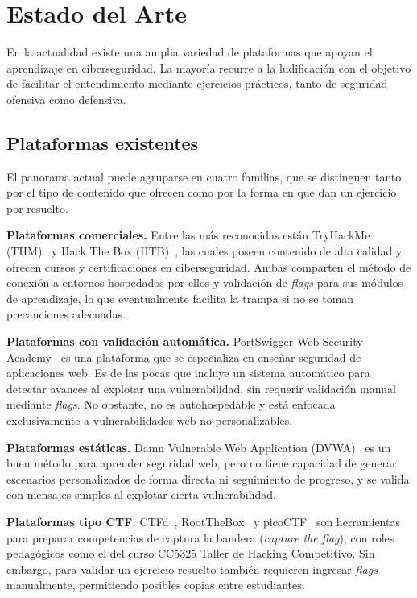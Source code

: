 \chapter{Estado del Arte}
\label{sec:estado-del-arte}

En la actualidad existe una amplia variedad de plataformas que apoyan el
aprendizaje en ciberseguridad. La mayoría recurre a la ludificación con el
objetivo de facilitar el entendimiento mediante ejercicios prácticos, tanto de
seguridad ofensiva como defensiva.

\section{Plataformas existentes}

El panorama actual puede agruparse en cuatro familias, que se distinguen tanto
por el tipo de contenido que ofrecen como por la forma en que dan un ejercicio
por resuelto.

\textbf{Plataformas comerciales.} Entre las más reconocidas están TryHackMe
(THM)~\cite{tryhackme} y Hack The Box (HTB)~\cite{hackthebox}, las cuales poseen
contenido de alta calidad y ofrecen cursos y certificaciones en ciberseguridad.
Ambas comparten el método de conexión a entornos hospedados por ellos y
validación de \textit{flags} para sus módulos de aprendizaje, lo que
eventualmente facilita la trampa si no se toman precauciones adecuadas.

\textbf{Plataformas con validación automática.} PortSwigger Web Security
Academy~\cite{portswigger} es una plataforma que se especializa en enseñar
seguridad de aplicaciones web. Es de las pocas que incluye un sistema
automático para detectar avances al explotar una vulnerabilidad, sin requerir
validación manual mediante \textit{flags}. No obstante, no es autohospedable y
está enfocada exclusivamente a vulnerabilidades web no personalizables.

\textbf{Plataformas estáticas.} Damn Vulnerable Web Application
(DVWA)~\cite{dvwa} es un buen método para aprender seguridad web, pero no
tiene capacidad de generar escenarios personalizados de forma directa ni
seguimiento de progreso, y se valida con mensajes simples al explotar cierta
vulnerabilidad.

\textbf{Plataformas tipo CTF.} CTFd~\cite{ctfd}, RootTheBox~\cite{rootthebox}
y picoCTF~\cite{picoctf} son herramientas para preparar competencias de
captura la bandera (\textit{capture the flag}), con roles pedagógicos como el
del curso CC5325 Taller de Hacking Competitivo. Sin embargo, para validar un
ejercicio resuelto también requieren ingresar \textit{flags} manualmente,
permitiendo posibles copias entre estudiantes.

